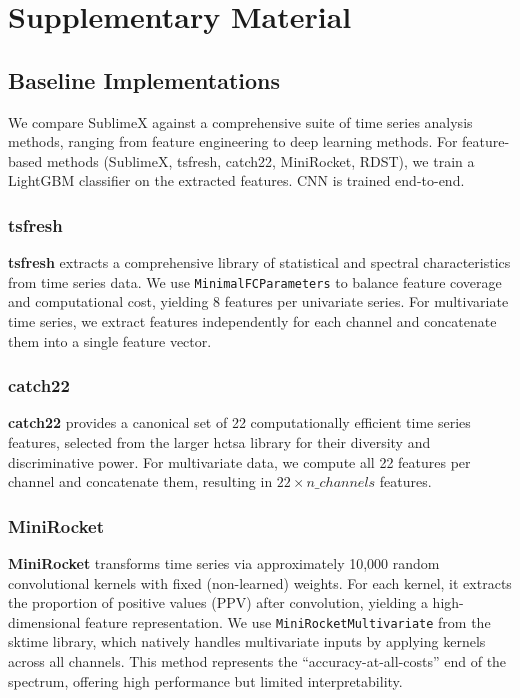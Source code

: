 \documentclass[times, review, 10pt]{elsarticle}
\begin{document}
\section{Supplementary Material}

\subsection{Baseline Implementations}

We compare SublimeX against a comprehensive suite of time series analysis methods, ranging from feature engineering to deep learning methods.
For feature-based methods (SublimeX, tsfresh, catch22, MiniRocket, RDST), we train a LightGBM classifier on the extracted features. CNN is trained end-to-end.

\subsubsection{tsfresh}
\textbf{tsfresh} \cite{christ2018tsfresh} extracts a comprehensive library of statistical and spectral characteristics from time series data.
We use \texttt{MinimalFCParameters} to balance feature coverage and computational cost, yielding 8 features per univariate series.
For multivariate time series, we extract features independently for each channel and concatenate them into a single feature vector.

\subsubsection{catch22}
\textbf{catch22} \cite{lubba2019catch22} provides a canonical set of 22 computationally efficient time series features, selected from the larger hctsa
library for their diversity and discriminative power.
For multivariate data, we compute all 22 features per channel and concatenate them, resulting in $22 \times n\_channels$ features.

\subsubsection{MiniRocket}
\textbf{MiniRocket} \cite{dempster2021minirocket} transforms time series via approximately 10,000 random convolutional kernels with fixed (non-learned) weights.
For each kernel, it extracts the proportion of positive values (PPV) after convolution, yielding a high-dimensional feature representation.
We use \texttt{MiniRocketMultivariate} from the sktime library, which natively handles multivariate inputs by applying kernels across all channels.
This method represents the ``accuracy-at-all-costs'' end of the spectrum, offering high performance but limited interpretability.
\end{document}
